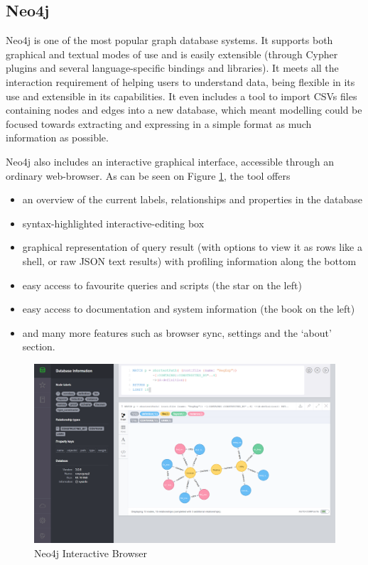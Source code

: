 \subsection{Neo4j}
\label{subsec:neo4jandtools}

Neo4j is one of the most popular graph database systems. It supports both
graphical and textual modes of use and is easily extensible (through Cypher
plugins and several language-specific bindings and libraries). It meets all the
interaction requirement of helping users to understand data, being flexible in
its use and extensible in its capabilities. It even includes a tool to import
CSVs files containing nodes and edges into a new database, which meant modelling
could be focused towards extracting and expressing in a simple format as much
information as possible.

Neo4j also includes an interactive graphical interface, accessible through an
ordinary web-browser. As can be seen on Figure \ref{fig:neo4jbrowser}, the tool
offers 
\begin{itemize}
  \item an overview of the current labels, relationships and properties in the
        database
  \item syntax-highlighted interactive-editing box
  \item graphical representation of query result (with options to view it as
        rows like a shell, or raw JSON text results) with profiling information
        along the bottom
  \item easy access to favourite queries and scripts (the star on the left)
  \item easy access to documentation and system information (the book on the
        left)
  \item and many more features such as browser sync, settings and the `about'
        section.
\end{itemize}

\begin{figure}[tbp]
  \includegraphics[width=\textwidth]{img/Neo4j_Browser.png}
  \caption{Neo4j Interactive Browser}
  \label{fig:neo4jbrowser}
\end{figure}

